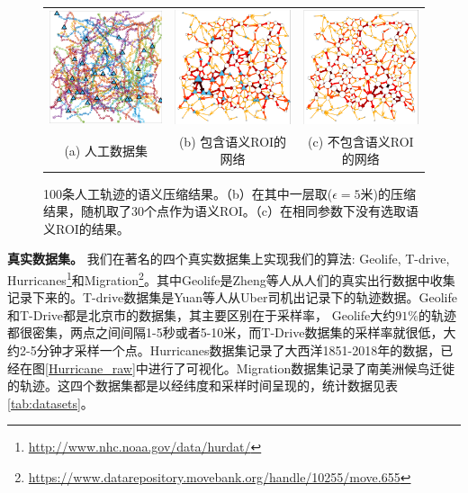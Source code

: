 \tabcolsep=0pt
\begin{figure}[!t]
\centering
\begin{tabular}{ccc}
\includegraphics[width=50mm]{pics/synthetic_raw.pdf}&
\includegraphics[width=50mm]{pics/syn_with_visualization.pdf}&
\includegraphics[width=50mm]{pics/syn_without_visulization.pdf}\\
(a) 人工数据集 & (b) 包含语义ROI的网络 & (c) 不包含语义ROI的网络  \\
\end{tabular}
\caption{100条人工轨迹的语义压缩结果。（b）在其中一层取($\epsilon=5$米)的压缩结果，随机取了30个点作为语义ROI。（c）在相同参数下没有选取语义ROI的结果。}
\label{fig:syntheticData} 
\end{figure}

\vspace{3mm}
\noindent\textbf{真实数据集。} 
我们在著名的四个真实数据集上实现我们的算法: Geolife, T-drive, Hurricanes\footnote{\url{http://www.nhc.noaa.gov/data/hurdat/}}和Migration\footnote{\url{https://www.datarepository.movebank.org/handle/10255/move.655}}。其中Geolife是Zheng等人从人们的真实出行数据中收集记录下来的。T-drive数据集是Yuan等人从Uber司机出记录下的轨迹数据。Geolife和T-Drive都是北京市的数据集，其主要区别在于采样率， Geolife大约$91\%$的轨迹都很密集，两点之间间隔1-5秒或者5-10米，而T-Drive数据集的采样率就很低，大约2-5分钟才采样一个点。Hurricanes数据集记录了大西洋1851-2018年的数据，已经在图\ref{Hurricane_raw}中进行了可视化。Migration数据集记录了南美洲候鸟迁徙的轨迹。这四个数据集都是以经纬度和采样时间呈现的，统计数据见表\ref{tab:datasets}。



